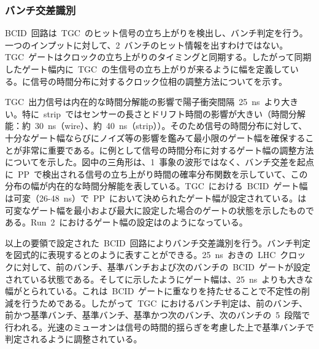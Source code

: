 \subsubsection{バンチ交差識別}\label{subsubsec:bcid}
BCID~回路は~TGC~のヒット信号の立ち上がりを検出し、バンチ判定を行う。一つのインプットに対して、2~バンチのヒット情報を出すわけではない。TGC~ゲートはクロックの立ち上がりのタイミングと同期する。したがって同期したゲート幅内に~TGC~の生信号の立ち上がりが来るように幅を定義している。に信号の時間分布に対するクロック位相の調整方法についてを示す。

TGC~出力信号は内在的な時間分解能の影響で陽子衝突間隔~25~ns~より大きい。特に~strip~ではセンサーの長さとドリフト時間の影響が大きい（時間分解能：約~30~ns（wire）、約~40~ns（strip））。そのため信号の時間分布に対して、十分なゲート幅ならびにノイズ等の影響を鑑みて最小限のゲート幅を確保することが非常に重要である。に例として信号の時間分布に対するゲート幅の調整方法についてを示した。図中の三角形は、1~事象の波形ではなく、バンチ交差を起点に~PP~で検出される信号の立ち上がり時間の確率分布関数を示していて、この分布の幅が内在的な時間分解能を表している。TGC~における~BCID~ゲート幅は可変（26-48~ns）で~PP~において決められたゲート幅が設定されている。は可変なゲート幅を最小および最大に設定した場合のゲートの状態を示したものである。Run~2~におけるゲート幅の設定はのようになっている。

以上の要領で設定された~BCID~回路によりバンチ交差識別を行う。バンチ判定を図式的に表現するとのように表すことができる。25~ns~おきの~LHC~クロックに対して、前のバンチ、基準バンチおよび次のバンチの~BCID~ゲートが設定されている状態である。そしてに示したようにゲート幅は、25~ns~よりも大きな幅がとられている。これは~BCID~ゲートに重なりを持たせることで不定性の削減を行うためである。したがって~TGC~におけるバンチ判定は、前のバンチ、前かつ基準バンチ、基準バンチ、基準かつ次のバンチ、次のバンチの~5~段階で行われる。光速のミューオンは信号の時間的揺らぎを考慮した上で基準バンチで判定されるように調整されている。

